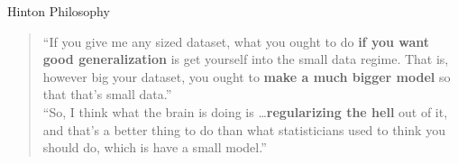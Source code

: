 \documentclass[t,xcolor=dvipsnames]{beamer}
\begin{document}
\begin{frame}{Hinton Philosophy}

\begin{quote}
``If you give me any sized dataset, what you ought to do \textbf{if you want good generalization} is get yourself into the small data regime. That is, however big your dataset, you ought to \textbf{make a much bigger model} so that that's small data.''\\

``So, I think what the brain is doing is \ldots \textbf{regularizing the hell} out of it, and that's a better thing to do than what statisticians used to think you should do, which is have a small model.'' \\
\end{quote}
\end{frame}
\end{document}
